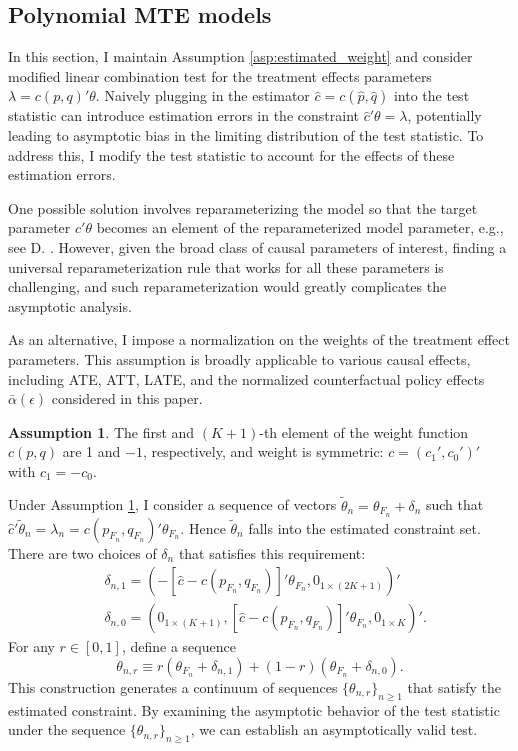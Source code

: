 \documentclass[11pt]{article}
\theoremstyle{definition}
\newtheorem{assumption}{Assumption}
\newcommand{\0}{\ensuremath{\mathbf{0}}}
\begin{document}
\begin{bibunit}
\subsection{Polynomial MTE models}

In this section, I maintain Assumption \ref{asp:estimated_weight} and consider modified linear combination test for the treatment effects parameters $\lambda = c(p,q)'\theta$. Naively plugging in the estimator $\hat{c} = c(\hat{p}, \hat{q})$ into the test statistic can introduce estimation errors in the constraint $\hat{c}'\theta = \lambda$, potentially leading to asymptotic bias in the limiting distribution of the test statistic. To address this, I modify the test statistic to account for the effects of these estimation errors.

One possible solution involves reparameterizing the model so that the target parameter $\hat{c}'\theta$ becomes an element of the reparameterized model parameter, e.g., see D. \citet{andrews.d:2017}. However, given the broad class of causal parameters of interest, finding a universal reparameterization rule that works for all these parameters is challenging, and such reparameterization would greatly complicates the asymptotic analysis.

As an alternative, I impose a normalization on the weights of the treatment effect parameters. This assumption is broadly applicable to various causal effects, including ATE, ATT, LATE, and the normalized counterfactual policy effects $\bar{\alpha}(\epsilon)$ considered in this paper. 

\begin{assumption}
\label{asp:weight_for_TE}
    The first and $(K+1)$-th element of the weight function $c(p,q)$ are 1 and $-1$, respectively, and weight is symmetric: $c = (c_1', c_0')'$ with $c_1 = -c_0$.
\end{assumption}

%
Under Assumption \ref{asp:weight_for_TE}, I consider a sequence of vectors $\tilde{\theta}_n = \theta_{F_n} + \delta_n$ such that $\hat{c}'\tilde{\theta}_n = \lambda_n = c(p_{F_n}, q_{F_n})' \theta_{F_n}$. Hence $\tilde{\theta}_n$ falls into the estimated constraint set. There are two choices of $\delta_n$ that satisfies this requirement:
\begin{align*}
    & \delta_{n,1} = (-[\hat{c} - c(p_{F_n},q_{F_n})]'\theta_{F_n}, 0_{1\times (2K+1)})' \\
    & \delta_{n,0} = (0_{1\times (K+1)}, [\hat{c} - c(p_{F_n},q_{F_n})]'\theta_{F_n}, 0_{1\times K})'.
\end{align*}
For any $r\in[0,1]$, define a sequence 
\begin{equation}
\label{eq:alt_theta_seq}
    \theta_{n,r} \equiv r(\theta_{F_n} + \delta_{n,1}) + (1-r)(\theta_{F_n} + \delta_{n,0}).
\end{equation} 
This construction generates a continuum of sequences $\{\theta_{n,r}\}_{n\geq 1}$ that satisfy the estimated constraint. By examining the asymptotic behavior of the test statistic under the sequence $\{\theta_{n,r}\}_{n \geq 1}$, we can establish an asymptotically valid test.


\end{bibunit}
\end{document}
